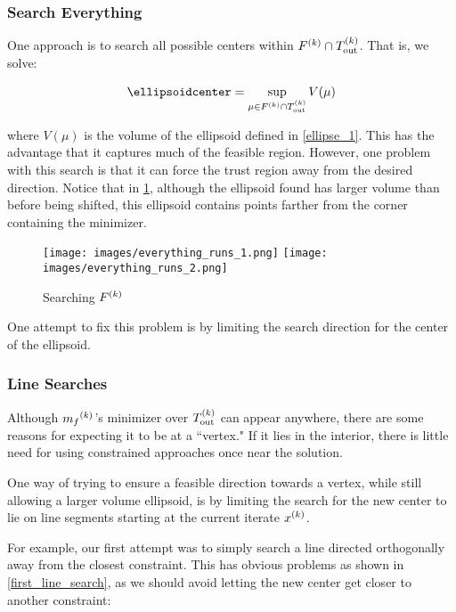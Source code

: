 \subsubsection{Search Everything}

One approach is to search all possible centers within $ {F}^{(k)} \cap {T_{\text{out}}^{(k)}} $.
That is, we solve:

\begin{align*}
\ellipsoidcenter = \sup_{\mu \in \feasiblek \cap \outertrk} V(\mu)
\end{align*}

where $V(\mu)$ is the volume of the ellipsoid defined in \cref{ellipse_1}.
This has the advantage that it captures much of the feasible region.
However, one problem with this search is that it can force the trust region away from the desired direction.
Notice that in \cref{ellipse_runs_away}, although the ellipsoid found has larger volume than before being shifted, this ellipsoid contains points farther from the corner containing the minimizer.

\begin{figure}[h]
    \centering
    \texttt{[image: images/everything\_runs\_1.png]}
    \texttt{[image: images/everything\_runs\_2.png]}
    \caption{Searching ${F}^{(k)}$}
    \label{ellipse_runs_away}
\end{figure}


One attempt to fix this problem is by limiting the search direction for the center of the ellipsoid.


\subsubsection{Line Searches}
Although ${{m}_f}^{(k)}$'s minimizer over ${T_{\text{out}}^{(k)}}$  can appear anywhere, there are some reasons for expecting it to be at a ``vertex."
If it lies in the interior, there is little need for using constrained approaches once near the solution.

One way of trying to ensure a feasible direction towards a vertex, while still allowing a larger volume ellipsoid, is by limiting the search for the new center to lie on line segments starting at the current iterate ${x}^{(k)}$.

For example, our first attempt was to simply search a line directed orthogonally away from the closest constraint.
This has obvious problems as shown in \cref{first_line_search}, as we should avoid letting the new center get closer to another constraint:

